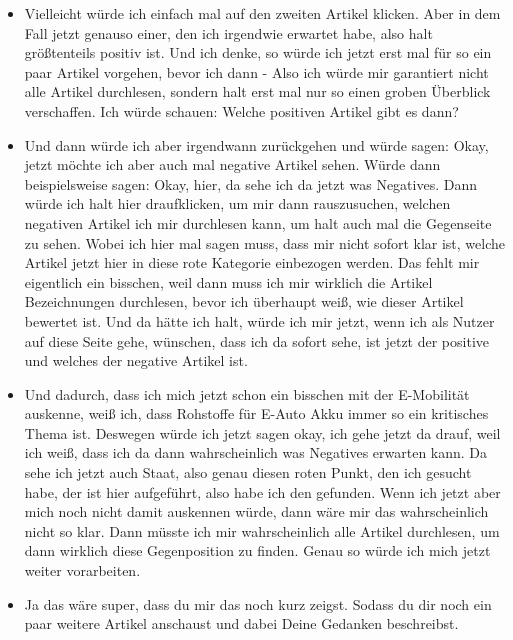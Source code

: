 {\begin{itemize}[]
        \item {} Vielleicht würde ich einfach mal auf den zweiten Artikel klicken.
              Aber in dem Fall jetzt genauso einer, den ich irgendwie erwartet habe, also halt größtenteils positiv ist.
              Und ich denke, so würde ich jetzt erst mal für so ein paar Artikel vorgehen, bevor ich dann - Also ich würde mir garantiert nicht alle Artikel durchlesen, sondern halt erst mal nur so einen groben Überblick verschaffen.
              Ich würde schauen: Welche positiven Artikel gibt es dann?
        \item {} Und dann würde ich aber irgendwann zurückgehen und würde sagen: Okay, jetzt möchte ich aber auch mal negative Artikel sehen.
              Würde dann beispielsweise sagen: Okay, hier, da sehe ich da jetzt was Negatives.
              Dann würde ich halt hier draufklicken, um mir dann rauszusuchen, welchen negativen Artikel ich mir durchlesen kann, um halt auch mal die Gegenseite zu sehen.
              Wobei ich hier mal sagen muss, dass mir nicht sofort klar ist, welche Artikel jetzt hier in diese rote Kategorie einbezogen werden.
              Das fehlt mir eigentlich ein bisschen, weil dann muss ich mir wirklich die Artikel Bezeichnungen durchlesen, bevor ich überhaupt weiß, wie dieser Artikel bewertet ist.
              Und da hätte ich halt, würde ich mir jetzt, wenn ich als Nutzer auf diese Seite gehe, wünschen, dass ich da sofort sehe, ist jetzt der positive und welches der negative Artikel ist.
        \item {} Und dadurch, dass ich mich jetzt schon ein bisschen mit der E-Mobilität auskenne, weiß ich, dass Rohstoffe für E-Auto Akku immer so ein kritisches Thema ist.
              Deswegen würde ich jetzt sagen okay, ich gehe jetzt da drauf, weil ich weiß, dass ich da dann wahrscheinlich was Negatives erwarten kann.
              Da sehe ich jetzt auch Staat, also genau diesen roten Punkt, den ich gesucht habe, der ist hier aufgeführt, also habe ich den gefunden.
              Wenn ich jetzt aber mich noch nicht damit auskennen würde, dann wäre mir das wahrscheinlich nicht so klar.
              Dann müsste ich mir wahrscheinlich alle Artikel durchlesen, um dann wirklich diese Gegenposition zu finden.
              Genau so würde ich mich jetzt weiter vorarbeiten.
        \item {} Ja das wäre super, dass du mir das noch kurz zeigst.
              Sodass du dir noch ein paar weitere Artikel anschaust und dabei Deine Gedanken beschreibst.

\end{itemize}}
